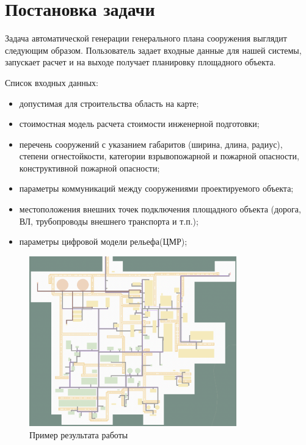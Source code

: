 \section*{\Large{Постановка задачи}}
Задача автоматической генерации генерального плана сооружения выглядит следующим образом.
Пользователь задает входные данные для нашей системы, запускает расчет и на выходе получает планировку площадного объекта.

\noindent Список входных данных:
\begin{itemize}
    \item допустимая для строительства область на карте;
    \item стоимостная модель расчета стоимости инженерной подготовки;
    \item перечень сооружений с указанием габаритов (ширина, длина, радиус),
    степени огнестойкости, категории взрывопожарной и пожарной опасности, конструктивной пожарной опасности;
    \item параметры коммуникаций между сооружениями проектируемого объекта;
    \item местоположения внешних точек подключения площадного объекта (дорога, ВЛ, трубопроводы внешнего транспорта и т.п.);
    \item параметры цифровой модели рельефа(ЦМР);
\end{itemize}

\begin{figure}
    \begin{center}
        \includegraphics[width=0.8\textwidth]{images/problem/1}
    \end{center}
    \caption{Пример результата работы}
    \label{pic:problem__site-plan}
\end{figure}

